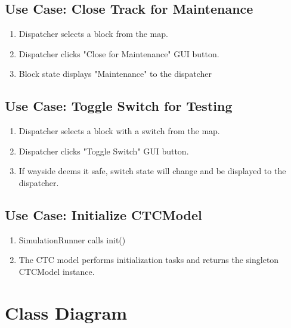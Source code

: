 \documentclass{scrreprt}
\begin{document}
\subsection{Use Case: Close Track for Maintenance}
\begin{enumerate}
	\item Dispatcher selects a block from the map.
	\item Dispatcher clicks "Close for Maintenance" GUI button.
	\item Block state displays "Maintenance" to the dispatcher
\end{enumerate}

\subsection{Use Case: Toggle Switch for Testing}
\begin{enumerate}
	\item Dispatcher selects a block with a switch from the map.
	\item Dispatcher clicks "Toggle Switch" GUI button.
	\item If wayside deems it safe, switch state will change and be displayed to the dispatcher.
\end{enumerate}

\subsection{Use Case: Initialize CTCModel}
\begin{enumerate}
	\item SimulationRunner calls init()
	\item The CTC model performs initialization tasks and returns the singleton CTCModel instance.
\end{enumerate}


\section{Class Diagram}
\end{document}
